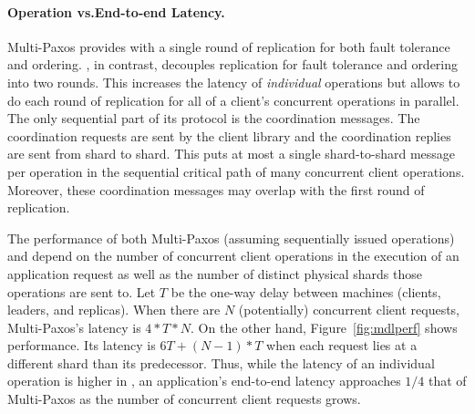 \paragraph{Operation vs.\@ End-to-end Latency.}
Multi-Paxos provides \sdl{} with a single round of replication for both fault
tolerance and ordering.  \sys{}, in contrast, decouples replication for fault
tolerance and ordering into two rounds.  This increases the latency of
\textit{individual} operations but allows \sys{} to do each round of
replication for all of a client's concurrent operations in parallel. The only
sequential part of its protocol is the coordination messages.  The
coordination requests are sent by the client library and the coordination
replies are sent from shard to shard.  This puts at most a single shard-to-shard
message per operation in the sequential critical path of many concurrent client
operations. Moreover, these coordination messages may overlap with the first
round of replication.

The performance of both Multi-Paxos (assuming sequentially issued operations) and \sys{} depend on the number of concurrent client operations in the execution of an
application request as well as the number of distinct physical shards those
operations are sent to. Let $T$ be the one-way delay between machines (clients,
leaders, and replicas).  When there are $N$ (potentially) concurrent client
requests, Multi-Paxos's latency is $4*T*N$. On the other hand,
Figure~\ref{fig:mdlperf} shows \sys{} performance. Its latency
is $6T + (N-1)*T$ when each request lies at a different shard
than its predecessor.  Thus, while the latency of an individual operation is
higher in \sys{}, an application's end-to-end latency approaches
$1/4$ that of Multi-Paxos as the number of concurrent client requests grows.




